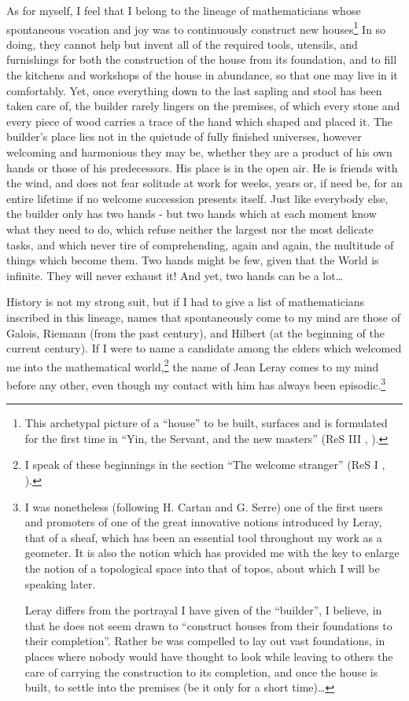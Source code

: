 As for myself, I feel that I belong to the lineage of mathematicians whose spontaneous
vocation and joy was to continuously construct new houses\footnote{This archetypal 
picture of a ``house''
to be built, 
surfaces and is formulated for the first time in ``Yin, the Servant, and the new masters''
(ReS III , ).
} In so doing, they cannot help but invent
all of the required tools, utensils, and 
furnishings for both the construction of the house from its foundation, and to fill
the kitchens and workshops of the house in abundance, so that one may live in it
comfortably. Yet, once everything down 
to the last sapling and stool has been taken care of, the builder rarely lingers on the
premises, of which every stone and every piece of wood carries a trace of the hand which
shaped and placed it. The builder's place lies not in the quietude of fully 
finished universes, however welcoming and harmonious they may be, whether they are a
product of his own hands or those of his predecessors. His place is in the open air. 
He is friends with the wind, and does not fear solitude at work for weeks, years or,
if need be, for an entire lifetime if no welcome succession presents itself.
Just like everybody else, the builder only has two hands - but two hands which at each
moment know what they need to do, which refuse neither the largest nor the most delicate
tasks, and which never tire of comprehending, again and again, the multitude of things 
which become them. Two hands might be few, given that the World is infinite. 
They will never exhaust it! And yet, two hands can be a lot\ldots

History is not my strong suit, but if I had to give a list of mathematicians inscribed in
this lineage, names that spontaneously come to my mind are those of Galois, Riemann (from
the past century), and Hilbert (at the beginning of the current century). If I were to
name a candidate among the elders which welcomed me into the mathematical
world,\footnote{I speak of these beginnings in the section ``The welcome stranger'' (ReS I
, ).} the name
of Jean Leray comes to my mind before any other, even though my contact with him has
always been episodic.\footnote{I was nonetheless (following H. Cartan and G. Serre) one of
the first users and promoters of one of the great innovative notions introduced by Leray,
that of a sheaf, which has been an essential tool throughout my work as a geometer. It is
also the notion which has provided me with the key to enlarge the notion of a topological
space into that of topos, about which I will be speaking later.

Leray differs from the portrayal I have given of the ``builder'', I believe, in that he
does not seem drawn to ``construct houses from their foundations to their completion''.
Rather be was compelled to lay out vast foundations, in places where nobody would have
thought to look while leaving to others the care of carrying the construction to its
completion, and once the house is built, to settle into the premises (be it only for a
short time)\ldots}

